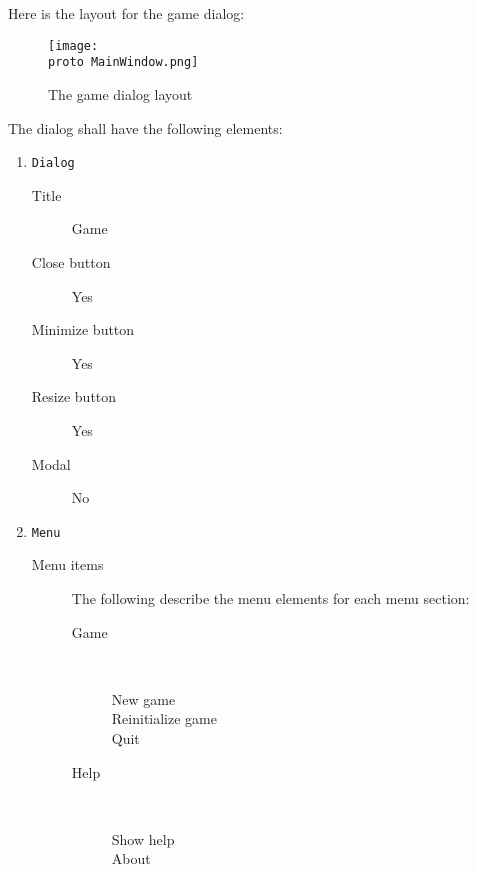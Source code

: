 Here is the layout for the game dialog:

\begin{figure}[H]
  \texttt{[image: \\proto MainWindow.png]}
  \caption{The game dialog layout}
  \label{fig:GameDlgLayout}
\end{figure}

The dialog shall have the following elements:

\begin{enumerate}

    \item \texttt{Dialog}
              \begin{description}
                  \item[Title] Game
                  \item[Close button] Yes
                  \item[Minimize button] Yes
                  \item[Resize button] Yes
                  \item[Modal] No
              \end{description}

    \item\texttt{Menu}
        \begin{description}
        \item[Menu items] The following describe the menu elements for
                          each menu section:
            \begin{description}

                \item[Game] ~
                    \begin{description}
                        \item[New game]
                        \item[Reinitialize game]
                        \item[Quit]
                    \end{description}

                \item[Help] ~
                    \begin{description}
                        \item[Show help]
                        \item[About ]
                    \end{description}

            \end{description}


\end{description}
\end{enumerate}
